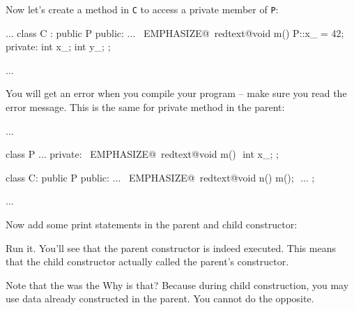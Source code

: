 Now let's create a method in \verb!C! to access a private member of
\verb!P!:
\begin{console}[commandchars=\~\@\$]
...
class C : public P
{
public:
        ...
        ~EMPHASIZE@~redtext@void m() { P::x_ = 42; }$$
private:
        int x_;
        int y_;
};

... 
\end{console}

You will get an error when you compile your program -- make sure you
read the error message. This is the same for private method in the
parent:
\begin{console}
...

class P
{     
...
private:
        ~EMPHASIZE@~redtext@void m() {}$$
        int x_;
};

class C: public P
{
public:
        ...
        ~EMPHASIZE@~redtext@void n() { m(); }$$
        ...
};

...
\end{console}

\newpage{}

Now add some print statements in the parent and child constructor:

Run it. You'll see that the parent constructor is indeed executed. This means that the child constructor actually called the parent's constructor.

Note that the  was  the  Why is that? Because during child construction, you may use data already constructed in the parent. You cannot do the opposite.

